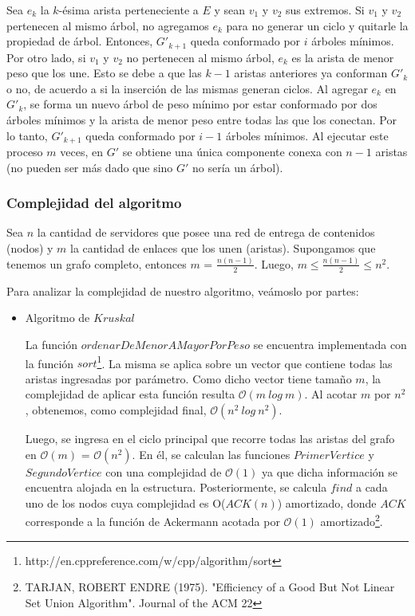 \begin{itemize}
 Sea $e_{k}$ la $k$-ésima arista perteneciente a $E$ y sean $v_{1}$ y $v_{2}$ sus extremos. Si $v_{1}$ y $v_{2}$ pertenecen al mismo árbol, no agregamos $e_{k}$ para no generar un ciclo y quitarle la propiedad de árbol. Entonces, $G'_{k+1}$ queda conformado por $i$ árboles mínimos.\newline
 \newline
Por otro lado, si $v_{1}$ y $v_{2}$ no pertenecen al mismo árbol, $e_{k}$ es la arista de menor peso que los une. Esto se debe a que las $k-1$ aristas anteriores ya conforman $G'_{k}$ o no, de acuerdo a si la inserción de las mismas generan ciclos. Al agregar $e_{k}$ en $G'_{k}$, se forma un nuevo árbol de peso mínimo por estar conformado por dos árboles mínimos y la arista de menor peso entre todas las que los conectan. Por lo tanto, $G'_{k+1}$ queda conformado por $i-1$ árboles mínimos.\newline \newline
Al ejecutar este proceso $m$ veces, en $G'$ se obtiene una única componente conexa con $n-1$ aristas (no pueden ser más dado que sino $G'$ no sería un árbol).

\subsubsection{Complejidad del algoritmo}

  Sea $n$ la cantidad de servidores que posee una red de entrega de contenidos (nodos) y $m$ la cantidad de enlaces que los unen (aristas). Supongamos que tenemos un grafo completo, entonces $m$ = $\frac{n(n-1)}{2}$. Luego, $m \leq \frac{n(n-1)}{2} \leq n^{2}$. 
 
  Para analizar la complejidad de nuestro algoritmo, veámoslo por partes: 
  
 \begin{itemize}
	
 \item Algoritmo de $Kruskal$
 
 La función $ordenarDeMenorAMayorPorPeso$ se encuentra implementada con la función $sort$\footnote{http://en.cppreference.com/w/cpp/algorithm/sort}. La misma se aplica sobre un vector que contiene todas las aristas ingresadas por parámetro. Como dicho vector tiene tamaño $m$, la complejidad de aplicar esta función resulta $\mathcal{O}(m\ log\ m)$. Al acotar $m$ por $n^{2}$, obtenemos, como complejidad final, $\mathcal{O}(n^{2}\ log\ n^{2})$.\newline

 Luego, se ingresa en el ciclo principal que recorre todas las aristas del grafo en $\mathcal{O}(m)$ = $\mathcal{O}(n^{2})$. En él, se calculan las funciones $PrimerVertice$ y $SegundoVertice$ con una complejidad de $\mathcal{O}(1)$ ya que dicha información se encuentra alojada en la estructura. Posteriormente, se calcula $find$ a cada uno de los nodos cuya complejidad es O($ACK(n)$) amortizado, donde $ACK$ corresponde a la función de Ackermann acotada por $\mathcal{O}(1)$ amortizado\footnote{TARJAN, ROBERT ENDRE (1975). "Efficiency of a Good But Not Linear Set Union Algorithm". Journal of the ACM 22}.\newline


\end{itemize}
\end{itemize}
